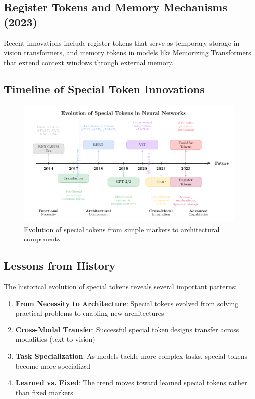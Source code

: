 \subsection{Register Tokens and Memory Mechanisms (2023)}

Recent innovations include register tokens \citep{darcet2023vision} that serve as temporary storage in vision transformers, and memory tokens in models like Memorizing Transformers \citep{wu2022memorizing} that extend context windows through external memory.

\subsection{Timeline of Special Token Innovations}

\begin{figure}[h]
\centering
\includegraphics[width=\textwidth]{part1/chapter01/fig_timeline}
\caption{Evolution of special tokens from simple markers to architectural components}
\end{figure}

\subsection{Lessons from History}

The historical evolution of special tokens reveals several important patterns:

\begin{principle}

\begin{enumerate}
\item \textbf{From Necessity to Architecture}: Special tokens evolved from solving practical problems to enabling new architectures
\item \textbf{Cross-Modal Transfer}: Successful special token designs transfer across modalities (text to vision)
\item \textbf{Task Specialization}: As models tackle more complex tasks, special tokens become more specialized
\item \textbf{Learned vs. Fixed}: The trend moves toward learned special tokens rather than fixed markers
\end{enumerate}
\end{principle}

